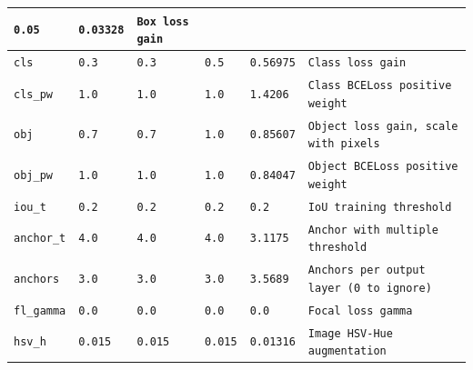 \begin{table}
\begin{tabular}{ | m{7.5em} | m{4em} | m{4em} | 
 m{4em}| m{4em} | m{16em} |}
            \centering\texttt{0.05} & 
            \centering\texttt{0.03328} &
            \texttt{Box loss gain}
            \tabularnewline
        \hline
            \texttt{cls} & 
            \centering\texttt{0.3} & 
            \centering\texttt{0.3} & 
            \centering\texttt{0.5} & 
            \centering\texttt{0.56975} &
            \texttt{Class loss gain}
            \tabularnewline
        \hline
            \texttt{cls\_pw} & 
            \centering\texttt{1.0} & 
            \centering\texttt{1.0} & 
            \centering\texttt{1.0} & 
            \centering\texttt{1.4206} &
            \texttt{Class BCELoss positive weight}
            \tabularnewline
        \hline
            \texttt{obj} & 
            \centering\texttt{0.7} & 
            \centering\texttt{0.7} & 
            \centering\texttt{1.0} & 
            \centering\texttt{0.85607} &
            \texttt{Object loss gain, scale with pixels}
            \tabularnewline
        \hline
            \texttt{obj\_pw} & 
            \centering\texttt{1.0} & 
            \centering\texttt{1.0} & 
            \centering\texttt{1.0} & 
            \centering\texttt{0.84047} &
            \texttt{Object BCELoss positive weight}
            \tabularnewline
        \hline
            \texttt{iou\_t} & 
            \centering\texttt{0.2} & 
            \centering\texttt{0.2} & 
            \centering\texttt{0.2} & 
            \centering\texttt{0.2} &
            \texttt{IoU training threshold}
            \tabularnewline
        \hline
            \texttt{anchor\_t} & 
            \centering\texttt{4.0} & 
            \centering\texttt{4.0} & 
            \centering\texttt{4.0} & 
            \centering\texttt{3.1175} &
            \texttt{Anchor with multiple threshold}
            \tabularnewline
        \hline
            \texttt{anchors} & 
            \centering\texttt{3.0} & 
            \centering\texttt{3.0} & 
            \centering\texttt{3.0} & 
            \centering\texttt{3.5689} &
            \texttt{Anchors per output layer (0 to ignore)}
            \tabularnewline
        \hline
            \texttt{fl\_gamma} & 
            \centering\texttt{0.0} & 
            \centering\texttt{0.0} & 
            \centering\texttt{0.0} & 
            \centering\texttt{0.0} &
            \texttt{Focal loss gamma}
            \tabularnewline
        \hline
            \texttt{hsv\_h} & 
            \centering\texttt{0.015} & 
            \centering\texttt{0.015} & 
            \centering\texttt{0.015} & 
            \centering\texttt{0.01316} &
            \texttt{Image HSV-Hue augmentation}

\end{tabular}
\end{table}
